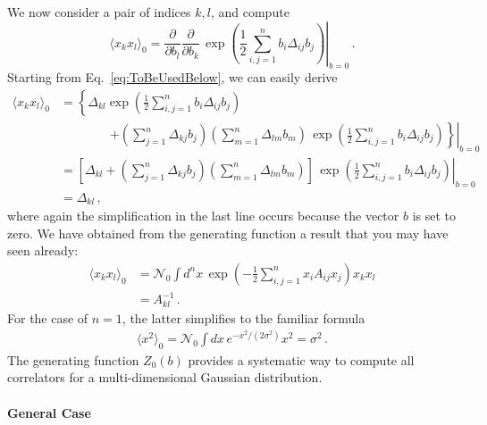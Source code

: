 \documentclass[notes.tex]{subfiles}
\begin{document}
We now consider a pair of indices $k,l$, and compute
\begin{equation}
  \label{eq:GaussTwoPt}
  \langle x_k x_l \rangle_0 = 
  \frac{\partial}{\partial b_l} \frac{\partial}{\partial b_k} \,
  \left. \exp\left(
    \frac12 \sum_{i,j=1}^n b_i \Delta_{ij} b_j
  \right) \right|_{b=0} \, .
\end{equation}
Starting from Eq.~\ref{eq:ToBeUsedBelow}, we can easily derive
\begin{align}
  \langle x_k x_l \rangle_0 &= 
 \left\{
   \Delta_{kl} \exp\left(
     \frac12 \sum_{i,j=1}^n b_i \Delta_{ij} b_j
   \right)
 \right. 
\\
  & \quad\quad\quad\quad \left. \left. + \left(
     \sum_{j=1}^n \Delta_{kj} b_j
    \right)
    \left(
     \sum_{m=1}^n \Delta_{lm} b_m
    \right)\, 
    \exp\left(
    \frac12 \sum_{i,j=1}^n b_i \Delta_{ij} b_j
  \right)
    \right\} \right|_{b=0} \\
  &= \left.\left[ \Delta_{kl} + \left(
     \sum_{j=1}^n \Delta_{kj} b_j
    \right)
    \left(
     \sum_{m=1}^n \Delta_{lm} b_m
    \right)
    \right]\, 
\exp\left(
    \frac12 \sum_{i,j=1}^n b_i \Delta_{ij} b_j
  \right)
   \right|_{b=0} \\
  &= \Delta_{kl}\, ,
\end{align}
where again the simplification in the last line occurs because the vector $b$ is set to zero. We have obtained from the generating function a result that you may have seen already: 
\begin{align}
  \langle x_k x_l \rangle_0 &= 
  \mathcal{N}_0 \int d^nx\, \exp\left(
    -\frac12 \sum_{i,j=1}^n x_i A_{ij} x_j
    \right) x_k x_l \\
  &= A^{-1}_{kl}\, .
\end{align}
For the case of $n=1$, the latter simplifies to the familiar formula
\begin{align}
  \langle x^2 \rangle_0 = 
  \mathcal{N}_0 \int dx\, e^{-x^2/(2\sigma^2)} x^2 = \sigma^2\, .
\end{align}
The generating function $Z_0(b)$ provides a systematic way to compute all correlators for a multi-dimensional Gaussian distribution. 

\paragraph{General Case}
\end{document}
